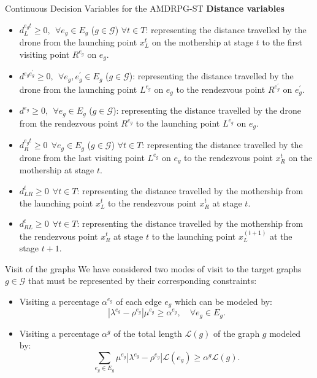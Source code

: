 \documentclass[slidestop,usepdftitle=false,10pt]{beamer}
\begin{document}
    \begin{frame}{Continuous Decision Variables for the AMDRPG-ST}
    \textbf{Distance variables}
    \begin{itemize}
        \small
        \item $d_L^{e_gt} \geq 0, \:\: \forall e_g \in E_g$ ($g \in \mathcal{G}$) $\forall t \in T$: representing the distance travelled by the drone from the launching point $x_L^t$ on the mothership at stage $t$ to the first visiting point $R^{e_g}$ on $e_g$.
        \item $d^{e_ge^\prime_g} \geq 0, \:\: \forall e_g, e^\prime_g \in E_g $ ($g \in \mathcal{G}$): representing the distance travelled by the drone from the launching
        point $L^{e_g}$ on $e_g$ to the rendezvous point $R^{e^\prime_g}$ on $e^\prime_g$.
        \item $d^{e_g} \geq 0, \:\: \forall e_g \in E_g$ ($g \in \mathcal{G}$): representing the distance travelled by the drone from the rendezvous point $R^{e_g}$ to the launching point $L^{e_g}$ on $e_g$. 
        \item $d_R^{e_gt} \geq 0 \:\: \forall e_g \in E_g$ ($g \in \mathcal{G}$) $\forall t \in T$: representing the distance travelled by the drone from the last
        visiting point $L^{e_g}$ on $e_g$ to the rendezvous point $x_R^t$ on the mothership at stage $t$.
        \item $d_{LR}^t \geq 0 \:\: \forall t \in T$: representing the distance travelled by the mothership from the launching point $x_L^t$ to the rendezvous point $x_R^t$ at stage $t$.
        \item $d_{RL}^t \geq 0 \:\: \forall t \in T$: representing the distance travelled by the mothership from the rendezvous point $x_R^t$ at stage $t$ to the launching point $x_L^{(t+1)}$ at the stage $t+1$.
    \end{itemize}
	\end{frame}

    	\begin{frame}{Visit of the graphs}
	    We have considered two modes of visit to the target graphs $g\in \mathcal{G}$ that must be represented by their corresponding constraints:
        \begin{itemize}
            \item Visiting a percentage $\alpha^{e_g}$ of each edge $e_g$ which can be modeled by:
            \begin{equation}\label{eq:alphaE}\tag{$\alpha$-E}
            |\lambda^{e_g} - \rho^{e_g}|\mu^{e_g}\geq \alpha^{e_g}, \quad \forall e_g\in E_g.
            \end{equation}
            \item Visiting a percentage $\alpha^g$ of the total length $\mathcal L(g)$ of the graph $g$ modeled by:
            \begin{equation}\label{eq:alphaG}\tag{$\alpha$-G}
            \sum_{e_g\in E_g} \mu^{e_g}|\lambda^{e_g} - \rho^{e_g}|\mathcal L(e_g) \geq \alpha^g\mathcal L(g).
            \end{equation}
        \end{itemize}
	\end{frame}
	
\end{document}
